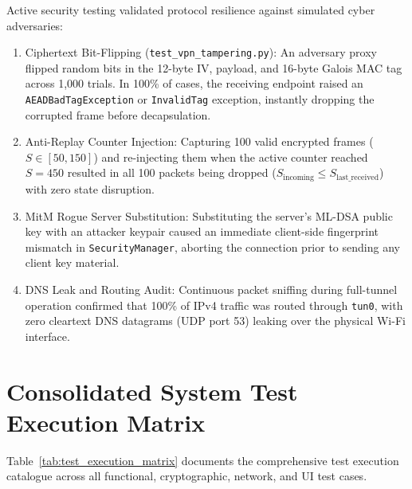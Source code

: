Active security testing validated protocol resilience against simulated cyber adversaries:
\begin{enumerate}
    \item Ciphertext Bit-Flipping (\texttt{test\_vpn\_tampering.py}): An adversary proxy flipped random bits in the 12-byte IV, payload, and 16-byte Galois MAC tag across 1,000 trials. In 100\% of cases, the receiving endpoint raised an \texttt{AEADBad}\allowbreak\texttt{TagException} or \texttt{InvalidTag} exception, instantly dropping the corrupted frame before decapsulation.
    \item Anti-Replay Counter Injection: Capturing 100 valid encrypted frames ($S \in [50, 150]$) and re-injecting them when the active counter reached $S = 450$ resulted in all 100 packets being dropped ($S_{\text{incoming}} \le S_{\text{last\_received}}$) with zero state disruption.
    \item MitM Rogue Server Substitution: Substituting the server's ML-DSA public key with an attacker keypair caused an immediate client-side fingerprint mismatch in \texttt{SecurityManager}, aborting the connection prior to sending any client key material.
    \item DNS Leak and Routing Audit: Continuous packet sniffing during full-tunnel operation confirmed that 100\% of IPv4 traffic was routed through \texttt{tun0}, with zero cleartext DNS datagrams (UDP port 53) leaking over the physical Wi-Fi interface.
\end{enumerate}

\section{Consolidated System Test Execution Matrix}
\label{sec:test_execution_matrix_sec}

Table~\ref{tab:test_execution_matrix} documents the comprehensive test execution catalogue across all functional, cryptographic, network, and UI test cases.


